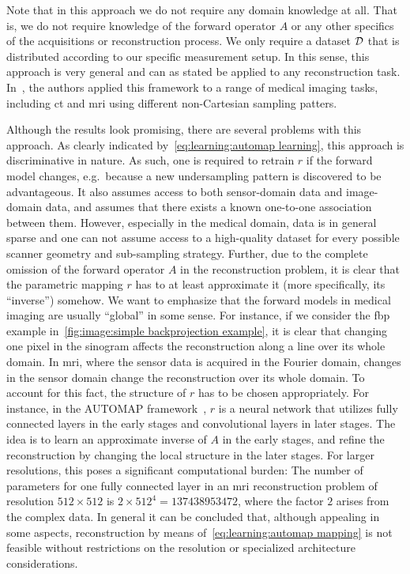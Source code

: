 \documentclass[../ml-ct.tex]{subfiles}
\begin{document}
Note that in this approach we do not require any domain knowledge at all.
That is, we do not require knowledge of the forward operator \( A \) or any other specifics of the acquisitions or reconstruction process.
We only require a dataset \( \mathcal{D} \) that is distributed according to our specific measurement setup.
In this sense, this approach is very general and can as stated be applied to any reconstruction task.
In~\cite{zhu_image_2018}, the authors applied this framework to a range of medical imaging tasks, including \gls{ct} and \gls{mri} using different non-Cartesian sampling patters.

Although the results look promising, there are several problems with this approach.
As clearly indicated by~\cref{eq:learning:automap learning}, this approach is discriminative in nature.
As such, one is required to retrain \( r \) if the forward model changes, e.g.\ because a new undersampling pattern is discovered to be advantageous.
It also assumes access to both sensor-domain data and image-domain data, and assumes that there exists a known one-to-one association between them.
However, especially in the medical domain, data is in general sparse and one can not assume access to a high-quality dataset for every possible scanner geometry and sub-sampling strategy.
Further, due to the complete omission of the forward operator \( A \) in the reconstruction problem, it is clear that the parametric mapping \( r \) has to at least approximate it (more specifically, its \enquote{inverse}) somehow.
We want to emphasize that the forward models in medical imaging are usually \enquote{global} in some sense.
For instance, if we consider the \gls{fbp} example in~\cref{fig:image:simple backprojection example}, it is clear that changing one pixel in the sinogram affects the reconstruction along a line over its whole domain.
In \gls{mri}, where the sensor data is acquired in the Fourier domain, changes in the sensor domain change the reconstruction over its whole domain.
To account for this fact, the structure of \( r \) has to be chosen appropriately.
For instance, in the AUTOMAP framework~\cite{zhu_image_2018}, \( r \) is a neural network that utilizes fully connected layers in the early stages and convolutional layers in later stages.
The idea is to learn an approximate inverse of \( A \) in the early stages, and refine the reconstruction by changing the local structure in the later stages.
For larger resolutions, this poses a significant computational burden:
The number of parameters for one fully connected layer in an \gls{mri} reconstruction problem of resolution \( \num{512} \times \num{512} \) is \( \num{2} \times \num{512}^{\num{4}} = \num{137438953472} \), where the factor \( \num{2} \) arises from the complex data.
In general it can be concluded that, although appealing in some aspects, reconstruction by means of~\cref{eq:learning:automap mapping} is not feasible without restrictions on the resolution or specialized architecture considerations.
\end{document}
